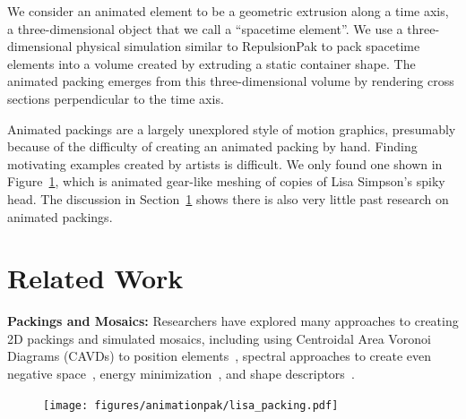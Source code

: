 We consider an animated
element to be a geometric extrusion along a time axis, a three-dimensional
object that we call a ``spacetime element''.  We use a three-dimensional physical simulation
similar to RepulsionPak to pack spacetime
elements into a volume created by extruding a static container shape.
The animated packing emerges from this three-dimensional volume by rendering 
cross sections perpendicular to the time axis.

\newtext
{
Animated packings are a largely unexplored style
of motion graphics, presumably because of the difficulty of creating 
an animated packing by hand.  
Finding motivating examples created by artists is difficult.
We only found one shown in Figure~\ref{fig_animationpak_lisa_packing},
which is animated gear-like meshing of copies of Lisa Simpson's spiky head.
The discussion in Section~\ref{animationpak_previous_work} shows there is also very little past research
on animated packings.
}



\section{Related Work}
\label{animationpak_previous_work}


\textbf{Packings and Mosaics:} 
Researchers have explored many approaches to creating 2D packings and
simulated mosaics, including using Centroidal Area Voronoi Diagrams (CAVDs) to
position elements~\cite{Hausner2001,Hiller2003,Smith2005}, spectral
approaches to create even negative space~\cite{Dalal2006}, energy
minimization~\cite{Kim2002}, and shape descriptors~\cite{Kwan2016}.

\begin{figure}[t]
\centering
\texttt{[image: figures/animationpak/lisa\_packing.pdf]} 
\caption[An animated packing of Lisas from The Simpsons.]
{\label{fig_animationpak_lisa_packing} 
}
\end{figure}

